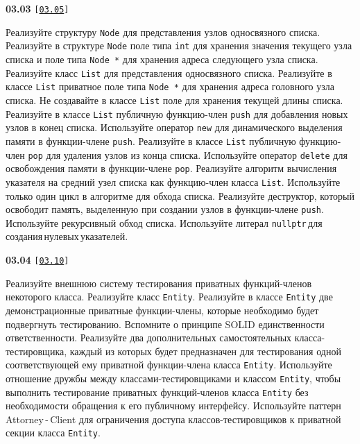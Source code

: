 \documentclass[a4paper,12pt]{article}
\begin{document}
\bigskip

{\large \textbf{03.03} \texttt{[\href{https://github.com/i-s-m-mipt/Education/blob/master/projects/examples/source/03.05.cpp}{\texttt{03.05}}]}}

\bigskip

Реализуйте структуру \lstinline{Node} для представления узлов односвязного списка. Реализуйте в структуре \lstinline{Node} поле типа \lstinline{int} для хранения значения текущего узла списка и поле типа \lstinline{Node *} для хранения адреса следующего узла списка. Реализуйте класс \lstinline{List} для представления односвязного списка. Реализуйте в классе \lstinline{List} приватное поле типа \lstinline{Node *} для хранения адреса головного узла списка. Не создавайте в классе \lstinline{List} поле для хранения текущей длины списка. Реализуйте в классе \lstinline{List} публичную функцию-член \lstinline{push} для добавления новых узлов в конец списка. Используйте оператор \lstinline{new} для динамического выделения памяти в функции-члене \lstinline{push}. Реализуйте в классе \lstinline{List} публичную функцию-член \lstinline{pop} для удаления узлов из конца списка. Используйте оператор \lstinline{delete} для освобождения памяти в функции-члене \lstinline{pop}. Реализуйте алгоритм вычисления указателя на средний узел списка как функцию-член класса \lstinline{List}. Используйте только один цикл в алгоритме для обхода списка. Реализуйте деструктор, который освободит память, выделенную при создании узлов в функции-члене \lstinline{push}. Используйте рекурсивный обход списка. Используйте литерал \lstinline{nullptr}\,для\,создания\,нулевых\,указателей.

\bigskip

{\large \textbf{03.04} \texttt{[\href{https://github.com/i-s-m-mipt/Education/blob/master/projects/examples/source/03.10.cpp}{\texttt{03.10}}]}}

\bigskip

Реализуйте внешнюю систему тестирования приватных функций-членов некоторого класса. Реализуйте класс \lstinline{Entity}. Реализуйте в классе \lstinline{Entity} две демонстрационные приватные функции-члены, которые необходимо будет подвергнуть тестированию. Вспомните о принципе SOLID единственности ответственности. Реализуйте два дополнительных самостоятельных класса-тестировщика, каждый из которых будет предназначен для тестирования одной соответствующей ему приватной функции-члена класса \lstinline{Entity}. Используйте отношение дружбы между классами-тестировщиками и классом \lstinline{Entity}, чтобы выполнить тестирование приватных функций-членов класса \lstinline{Entity} без необходимости обращения к его публичному интерфейсу. Используйте паттерн Attorney\,-\,Client для ограничения доступа классов-тестировщиков к приватной секции класса \lstinline{Entity}.
\end{document}
